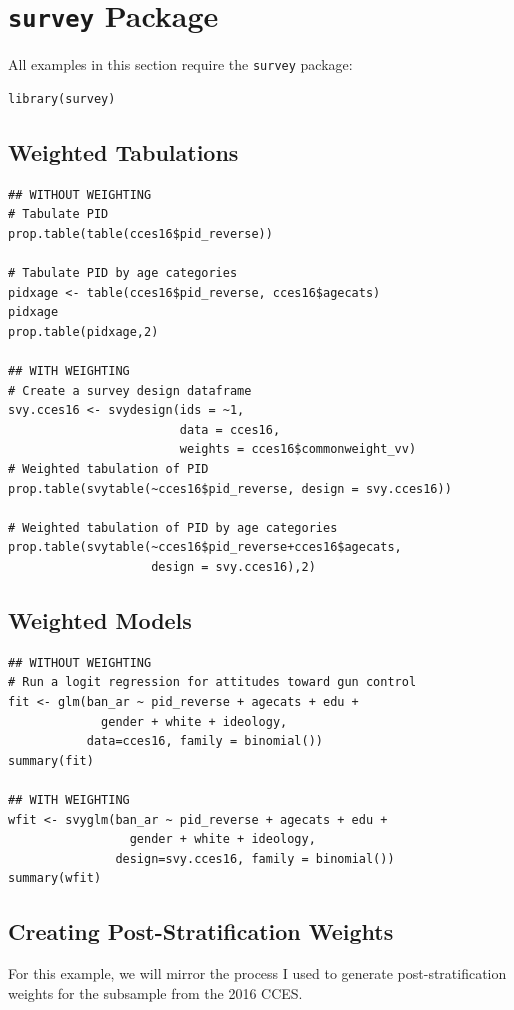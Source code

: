\documentclass[12pt, letterpaper,notitlepage]{article}
\begin{document}
\newpage

\section{\texttt{survey} Package}
All examples in this section require the \texttt{survey} package:
\begin{lstlisting}
library(survey)
\end{lstlisting}

\subsection{Weighted Tabulations}
\begin{lstlisting}
## WITHOUT WEIGHTING 
# Tabulate PID
prop.table(table(cces16$pid_reverse))

# Tabulate PID by age categories
pidxage <- table(cces16$pid_reverse, cces16$agecats)
pidxage
prop.table(pidxage,2)

## WITH WEIGHTING
# Create a survey design dataframe
svy.cces16 <- svydesign(ids = ~1, 
                        data = cces16, 
                        weights = cces16$commonweight_vv)
# Weighted tabulation of PID
prop.table(svytable(~cces16$pid_reverse, design = svy.cces16))

# Weighted tabulation of PID by age categories
prop.table(svytable(~cces16$pid_reverse+cces16$agecats, 
                    design = svy.cces16),2)
\end{lstlisting}

\subsection{Weighted Models}
\begin{lstlisting}
## WITHOUT WEIGHTING 
# Run a logit regression for attitudes toward gun control
fit <- glm(ban_ar ~ pid_reverse + agecats + edu + 
             gender + white + ideology,
           data=cces16, family = binomial())
summary(fit)

## WITH WEIGHTING
wfit <- svyglm(ban_ar ~ pid_reverse + agecats + edu + 
                 gender + white + ideology,
               design=svy.cces16, family = binomial())
summary(wfit)
\end{lstlisting}

\newpage

\subsection{Creating Post-Stratification Weights}
For this example, we will mirror the process I used to generate post-stratification weights for the subsample from the 2016 CCES.
\end{document}
